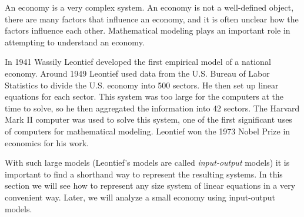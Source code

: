  \label{chap:matrix_vector}

\vspace*{-17 pt}

\vspace*{13 pt}

\label{sec:appl_model_econ}

An economy is a very complex system. An economy is not a well-defined object, there are many factors that influence an economy, and it is often unclear how the factors influence each other. Mathematical modeling plays an important role in attempting to understand an economy.

In 1941 Wassily Leontief developed the first empirical model of a national economy. Around 1949 Leontief used data from the U.S. Bureau of Labor Statistics to divide the U.S. economy into 500 sectors. He then set up linear equations for each sector. This system was too large for the computers at the time to solve, so he then aggregated the information into 42 sectors. The Harvard Mark II computer was used to solve this system, one of the first significant uses of computers for mathematical modeling. Leontief won the 1973 Nobel Prize in economics for his work. 

With such large models (Leontief's models are called \emph{input-output} models) it is important to find a shorthand way to represent the resulting systems.  In this section we will see how to represent any size system of linear equations in a very convenient way. Later, we will analyze a small economy using input-output models. 

